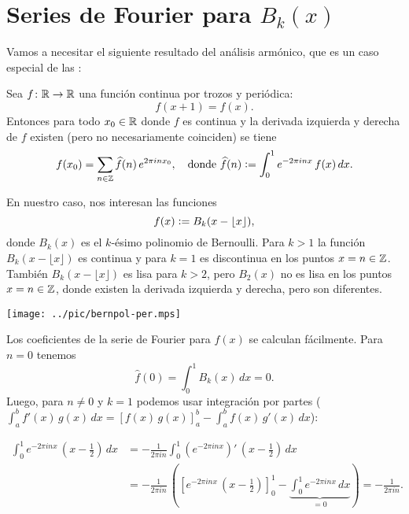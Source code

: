 \documentclass{article}
\begin{document}

\section*{Series de Fourier para $B_k (x)$}

Vamos a necesitar el siguiente resultado del análisis armónico, que es un caso especial de las :

\begin{hecho*}
Sea $f\colon \mathbb{R} \to \mathbb{R}$ una función continua por trozos y periódica:
$$f (x+1) = f (x).$$
Entonces para todo $x_0\in \mathbb{R}$ donde $f$ es continua y la derivada izquierda y derecha de $f$ existen (pero no necesariamente coinciden) se tiene
$$f (x_0) = \sum_{n\in\mathbb{Z}} \widehat{f} (n) \, e^{2\pi i n x_0}, \quad \text{donde }\widehat{f} (n) \mathrel{\mathop:}= \int_0^1 e^{-2\pi i n x} \, f(x) \, dx.$$
\end{hecho*}

\vspace{1em}

En nuestro caso, nos interesan las funciones
$$f (x) \mathrel{\mathop:}= B_k (x - \lfloor x\rfloor),$$
donde $B_k (x)$ es el $k$-ésimo polinomio de Bernoulli. Para $k > 1$ la función $B_k (x - \lfloor x\rfloor)$ es continua y para $k = 1$ es discontinua en los puntos $x = n \in \mathbb{Z}$. También $B_k (x - \lfloor x\rfloor)$ es lisa para $k > 2$, pero $B_2 (x)$ no es lisa en los puntos $x = n \in \mathbb{Z}$, donde existen la derivada izquierda y derecha, pero son diferentes.

\begin{center}
\texttt{[image: ../pic/bernpol-per.mps]}
\end{center}

Los coeficientes de la serie de Fourier para $f (x)$ se calculan fácilmente. Para $n = 0$ tenemos
$$\widehat{f} (0) = \int_0^1 B_k (x)\,dx = 0.$$
Luego, para $n \ne 0$ y $k = 1$ podemos usar integración por partes ($\int_a^b f'(x)\,g(x)\,dx = \left[f(x)\,g(x)\right]_a^b - \int_a^b f(x) \, g'(x)\,dx$):

\begin{align*}
\int_0^1 e^{-2\pi i n x}\,\left(x - \frac{1}{2}\right)\,dx & = -\frac{1}{2\pi i n} \int_0^1 \left(e^{-2\pi i n x}\right)' \, \left(x - \frac{1}{2}\right)\,dx \\
 & = -\frac{1}{2\pi i n} \, \left( \left[e^{-2\pi i n x}\,\left(x - \frac{1}{2}\right)\right]^1_0 - \underbrace{\int_0^1 e^{-2\pi i n x}\,dx}_{=0} \right) = -\frac{1}{2\pi i n}.
\end{align*}
\end{document}
